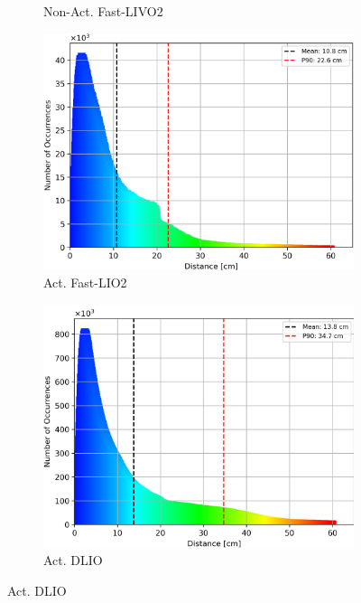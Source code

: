 \documentclass[conference]{IEEEtran}
\begin{document}
\begin{figure}
\begin{subfigure}{0.18\textwidth}
    \caption{Non-Act. Fast-LIVO2}
    \label{fig:hist_non_livo}
\end{subfigure}
\hfill
\begin{subfigure}{0.18\textwidth}
    \centering
    \includegraphics[width=\textwidth]{pics/histogram_results/histogram_cond_actuated_lio.png}
    \caption{Act. Fast-LIO2}
    \label{fig:hist_act_lio}
\end{subfigure}
\hfill
\begin{subfigure}{0.18\textwidth}
    \centering
    \includegraphics[width=\textwidth]{pics/histogram_results/histogram_cond_actuated_dlio.png}
    \caption{Act. DLIO}
    \label{fig:hist_act_dlio}
\end{subfigure}

\end{figure}
\end{document}
